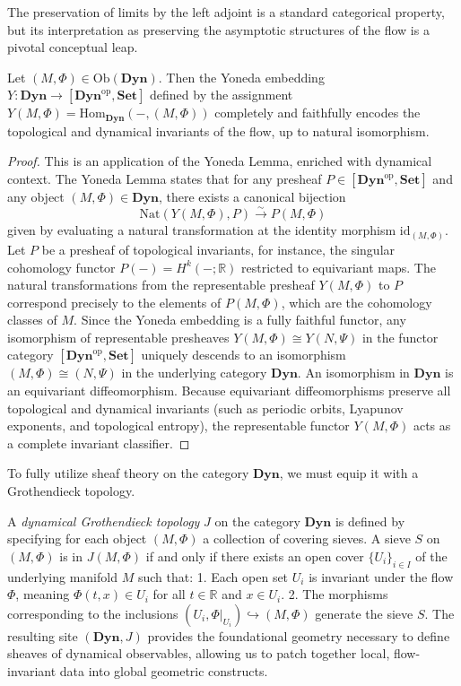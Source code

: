 The preservation of limits by the left adjoint is a standard categorical property, but its interpretation as preserving the asymptotic structures of the flow is a pivotal conceptual leap.

\begin{lemma}
\label{lem:yoneda_flow}
Let $(M, \Phi) \in \text{Ob}(\mathbf{Dyn})$. Then the Yoneda embedding $Y: \mathbf{Dyn} \to [\mathbf{Dyn}^\text{op}, \mathbf{Set}]$ defined by the assignment $Y(M, \Phi) = \text{Hom}_{\mathbf{Dyn}}(-, (M, \Phi))$ completely and faithfully encodes the topological and dynamical invariants of the flow, up to natural isomorphism.
\end{lemma}

\begin{proof}
This is an application of the Yoneda Lemma, enriched with dynamical context. The Yoneda Lemma states that for any presheaf $P \in [\mathbf{Dyn}^\text{op}, \mathbf{Set}]$ and any object $(M, \Phi) \in \mathbf{Dyn}$, there exists a canonical bijection
\[ \text{Nat}(Y(M, \Phi), P) \xrightarrow{\sim} P(M, \Phi) \]
given by evaluating a natural transformation at the identity morphism $\text{id}_{(M, \Phi)}$.
Let $P$ be a presheaf of topological invariants, for instance, the singular cohomology functor $P(-) = H^k(-; \mathbb{R})$ restricted to equivariant maps. The natural transformations from the representable presheaf $Y(M, \Phi)$ to $P$ correspond precisely to the elements of $P(M, \Phi)$, which are the cohomology classes of $M$.
Since the Yoneda embedding is a fully faithful functor, any isomorphism of representable presheaves $Y(M, \Phi) \cong Y(N, \Psi)$ in the functor category $[\mathbf{Dyn}^\text{op}, \mathbf{Set}]$ uniquely descends to an isomorphism $(M, \Phi) \cong (N, \Psi)$ in the underlying category $\mathbf{Dyn}$. An isomorphism in $\mathbf{Dyn}$ is an equivariant diffeomorphism. Because equivariant diffeomorphisms preserve all topological and dynamical invariants (such as periodic orbits, Lyapunov exponents, and topological entropy), the representable functor $Y(M, \Phi)$ acts as a complete invariant classifier.
\end{proof}

To fully utilize sheaf theory on the category $\mathbf{Dyn}$, we must equip it with a Grothendieck topology.

\begin{definition}
A \emph{dynamical Grothendieck topology} $J$ on the category $\mathbf{Dyn}$ is defined by specifying for each object $(M, \Phi)$ a collection of covering sieves. A sieve $S$ on $(M, \Phi)$ is in $J(M, \Phi)$ if and only if there exists an open cover $\{U_i\}_{i \in I}$ of the underlying manifold $M$ such that:
1. Each open set $U_i$ is invariant under the flow $\Phi$, meaning $\Phi(t, x) \in U_i$ for all $t \in \mathbb{R}$ and $x \in U_i$.
2. The morphisms corresponding to the inclusions $(U_i, \Phi|_{U_i}) \hookrightarrow (M, \Phi)$ generate the sieve $S$.
The resulting site $(\mathbf{Dyn}, J)$ provides the foundational geometry necessary to define sheaves of dynamical observables, allowing us to patch together local, flow-invariant data into global geometric constructs.
\end{definition}

